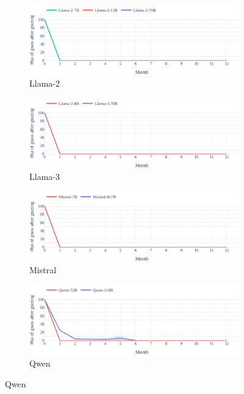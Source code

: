 \documentclass{article}
\begin{document}
\begin{figure}[h]
    \vspace{0.5em}
    \begin{subfigure}{0.49\textwidth}
            \includegraphics[width=\linewidth]{fig/sheep/sheep-baseline_concurrent-resource_over_time-Llama-2.pdf}
            \caption{Llama-2}
    \end{subfigure}
    \hspace{0.5em}
    \begin{subfigure}{0.49\textwidth}
             \includegraphics[width=\linewidth]{fig/sheep/sheep-baseline_concurrent-resource_over_time-Llama-3.pdf}
             \caption{Llama-3}
    \end{subfigure}

    \vspace{0.5em}
    \begin{subfigure}{0.49\textwidth}
            \includegraphics[width=\linewidth]{fig/sheep/sheep-baseline_concurrent-resource_over_time-Mistral.pdf}
            \caption{Mistral}
    \end{subfigure}
    \hspace{0.5em}
    \begin{subfigure}{0.49\textwidth}
             \includegraphics[width=\linewidth]{fig/sheep/sheep-baseline_concurrent-resource_over_time-Qwen.pdf}
             \caption{Qwen}
    \end{subfigure}
    

\end{figure}
\end{document}
